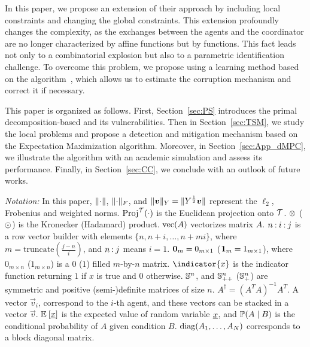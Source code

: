 \documentclass{ifacconf}  %
\begin{document}
In this paper, we propose an extension of their approach by including local constraints and changing the global constraints.
This extension profoundly changes the complexity, as the exchanges between the agents and the coordinator are no longer characterized by affine functions but by \pwa{} functions.
This fact leads not only to a combinatorial explosion but also to a parametric identification challenge.
To overcome this problem, we propose using a learning method based on the \EM{} algorithm~\citep{DempsterEtAl1977}, which allows us to estimate the corruption mechanism and correct it if necessary.

This paper is organized as follows.
First, Section~\ref{sec:PS} introduces the primal decomposition-based \dmpc{} and its vulnerabilities.
Then in Section~\ref{sec:TSM}, we study the local problems and propose a detection and mitigation mechanism based on the Expectation Maximization algorithm.
Moreover, in Section~\ref{sec:App_dMPC}, we illustrate the algorithm with an academic simulation and assess its performance.
Finally, in Section~\ref{sec:CC}, we conclude with an outlook of future works.

\emph{Notation:}
In this paper, $\lVert\cdot\rVert$, $\lVert\cdot\rVert_{F}$, and ${\lVert\boldsymbol{v}\rVert_{Y}=\lVert Y^{\frac{1}{2}}\boldsymbol{v}\rVert}$ represent the $\ell_{2}$, Frobenius and weighted norms.
$\operatorname{Proj}^{\mathcal{T}}(\cdot)$ is the Euclidean projection onto $\mathcal{T}$.
$\mathbin{\otimes}$ ($\odot$) is the Kronecker (Hadamard) product.
$\mathrm{vec} (A)$ vectorizes matrix $A$.
${n\mathbin{:} i\mathbin{:} j}$ is a row vector builder with elements $\{n,n+i,\dots,n+mi\}$, where ${m=\mathrm{truncate}(\frac{j-n}{i})}$, and ${n\mathbin{:} j}$ means ${i=1}$.
${\mathbf{0}_{m}=0_{m\times 1}}$ (${\mathbf{1}_{m}=1_{m\times 1}}$), where
$0_{m\times n}$ ($1_{m\times n}$) is a $0$ ($1$) filled \mbox{$m$-by-$n$} matrix.
$\indicator{x}$ is the indicator function returning $1$ if $x$ is true and $0$ otherwise.
$\mathbb{S}^{n}$, and $\mathbb{S}_{++}^{n}$ ($\mathbb{S}_{+}^{n}$) are symmetric and positive (semi-)definite matrices of size $n$.
${A^{\dagger}={{(A^{T}A)}^{-1}A^{T}}}$.
A vector $\vec{v}_{i}$, correspond to the $i$-th agent, and these vectors can be stacked in a vector $\vec{v}$.
$\mathbb{E}_{}\left[\underline{x}\right]$ is the expected value of random variable $\underline{x}$, and $\mathbb{P}(A \mid B)$ is the conditional probability of $A$ given condition $B$.
${\operatorname{diag}(A_{1},\dots,A_{N})}$ corresponds to a block diagonal matrix.
\end{document}
